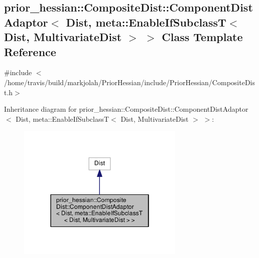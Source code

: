 \hypertarget{classprior__hessian_1_1CompositeDist_1_1ComponentDistAdaptor_3_01Dist_00_01meta_1_1EnableIfSubcld67d34d533dbae21b9dad35557546eec}{}\subsection{prior\+\_\+hessian\+:\+:Composite\+Dist\+:\+:Component\+Dist\+Adaptor$<$ Dist, meta\+:\+:Enable\+If\+SubclassT$<$ Dist, Multivariate\+Dist $>$ $>$ Class Template Reference}
\label{classprior__hessian_1_1CompositeDist_1_1ComponentDistAdaptor_3_01Dist_00_01meta_1_1EnableIfSubcld67d34d533dbae21b9dad35557546eec}


{\ttfamily \#include $<$/home/travis/build/markjolah/\+Prior\+Hessian/include/\+Prior\+Hessian/\+Composite\+Dist.\+h$>$}



Inheritance diagram for prior\+\_\+hessian\+:\+:Composite\+Dist\+:\+:Component\+Dist\+Adaptor$<$ Dist, meta\+:\+:Enable\+If\+SubclassT$<$ Dist, Multivariate\+Dist $>$ $>$\+:\nopagebreak
\begin{figure}[H]
\begin{center}
\leavevmode
\includegraphics[width=226pt]{classprior__hessian_1_1CompositeDist_1_1ComponentDistAdaptor_3_01Dist_00_01meta_1_1EnableIfSubcl882fe2afa4dd714ab17964d670d0fac6}
\end{center}
\end{figure}


